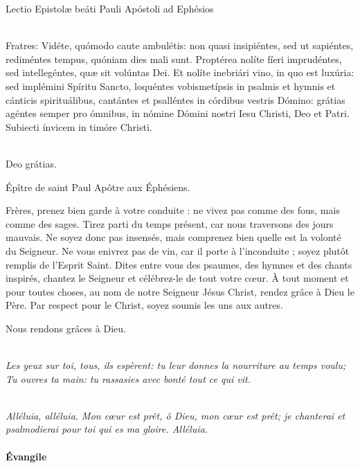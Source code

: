 \documentclass[twoside]{article}
\begin{document}
\begin{paracol}{2}
Lectio Epistolæ beáti Pauli Apóstoli ad Ephésios

\\
Fratres: Vidéte, quómodo caute ambulétis: non quasi insipiéntes, sed ut sapiéntes, rediméntes tempus, quóniam dies mali sunt. Proptérea nolíte fíeri imprudéntes, sed intellegéntes, quæ sit volúntas Dei. Et nolíte inebriári vino, in quo est luxúria: sed implémini Spíritu Sancto, loquéntes vobismetípsis in psalmis et hymnis et cánticis spirituálibus, cantántes et psalléntes in córdibus vestris Dómino: grátias agéntes semper pro ómnibus, in nómine Dómini nostri Iesu Christi, Deo et Patri. Subiecti ínvicem in timóre Christi.

\\
\rr Deo grátias.

\switchcolumn
Épître de saint Paul Apôtre aux Éphésiens.

Frères, prenez bien garde à votre conduite : ne vivez pas comme des fous, mais comme des sages.
Tirez parti du temps présent, car nous traversons des jours mauvais.
Ne soyez donc pas insensés, mais comprenez bien quelle est la volonté du Seigneur.
Ne vous enivrez pas de vin, car il porte à l’inconduite ; soyez plutôt remplis de l’Esprit Saint.
Dites entre vous des psaumes, des hymnes et des chants inspirés, chantez le Seigneur et célébrez-le de tout votre cœur.
À tout moment et pour toutes choses, au nom de notre Seigneur Jésus Christ, rendez grâce à Dieu le Père.
Par respect pour le Christ, soyez soumis les uns aux autres.

\rr Nous rendons grâces à Dieu.

\end{paracol}


\\
\emph{\rr Les yeux sur toi, tous, ils espèrent: tu leur donnes la nourriture au temps voulu;\\
\vv Tu ouvres ta main: tu rassasies avec bonté tout ce qui vit.}


\\
\emph{Alléluia, alléluia. Mon cœur est prêt, ô Dieu, mon cœur est prêt; je chanterai et psalmodierai pour toi qui es ma gloire. Alléluia.}

\paragraph{Évangile}
\end{document}
